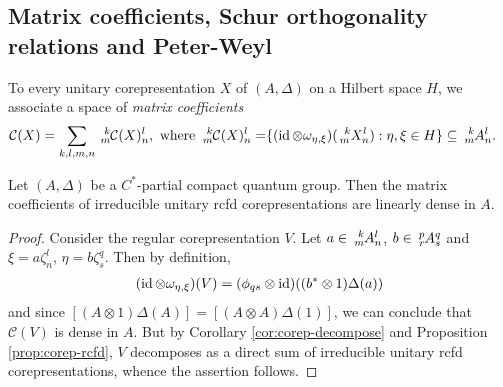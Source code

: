 \subsection{Matrix coefficients, Schur orthogonality relations and Peter-Weyl}


To every unitary corepresentation $X$ of $(A,\Delta)$ on a Hilbert space $H$, we associate a space
of \emph{matrix coefficients}
\begin{align*}
\mathcal{C}(X) = \sum_{k,l,m,n}  \Gr{\mathcal{C}(X)}{k}{l}{m}{n},
\text{ where } \Gr{\mathcal{C}(X)}{k}{l}{m}{n} = \span \{ (\id \otimes
  \omega_{\eta,\xi})(\Gr{X}{k}{l}{m}{n}) : \eta,\xi \in H\} \subseteq
  \Gr{A}{k}{l}{m}{n}.
\end{align*}

\begin{Prop} \label{prop:matrix-coefficients-dense}    Let $(A,\Delta)$ be a $C^{*}$-partial compact quantum group.   Then the matrix coefficients of irreducible unitary rcfd corepresentations
  are linearly dense in $A$. 
\end{Prop}
\begin{proof}
  Consider the regular corepresentation $V$. Let $a\in \Gr{A}{k}{l}{m}{n}$, $b\in
  \Gr{A}{p}{q}{r}{s}$ and $\xi=a\zeta^{l}_{n}$, $\eta=b\zeta^{q}_{s}$. Then by definition,
  \begin{align*}
    (\operatorname{id} \otimes \omega_{\eta,\xi})(V) = (\phi_{qs}\otimes \operatorname{id})((b^{*} \otimes
    1)\Delta(a))
  \end{align*}
  and since $[(A\otimes 1)\Delta(A)]=[(A\otimes A)\Delta(1)]$, we can conclude that $\mathcal{C}(V)$
  is dense in $A$. But by Corollary \ref{cor:corep-decompose} and Proposition \ref{prop:corep-rcfd}, $V$ decomposes as a direct sum of
  irreducible unitary rcfd corepresentations, whence the assertion follows.
\end{proof}

